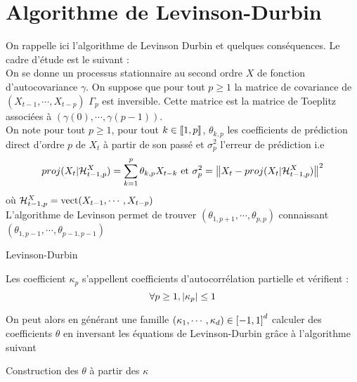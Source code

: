 \documentclass{report}
\begin{document}
\section{Algorithme de Levinson-Durbin}
On rappelle ici l'algorithme de Levinson Durbin et quelques conséquences. Le cadre d'étude est le suivant : \\
On se donne un processus stationnaire au second ordre $X$ de fonction d'autocovariance $\gamma$. On suppose que pour tout $p\geq 1$ la matrice de covariance de $(X_{t-1}, \cdots , X_{t-p})$ $\Gamma_p$ est inversible. Cette matrice est la matrice de Toeplitz associées à $(\gamma(0),\cdots, \gamma(p-1))$.  \\
On note pour tout $p\geq 1$, pour tout $k\in { \left\llbracket 1,p \right\rrbracket}$, $\theta_{k,p}$ les coefficients de prédiction direct d'ordre $p$ de $X_t$ à partir de son passé et $\sigma_p^2$ l'erreur de prédiction i.e 
$$
proj(X_t | \mathcal{H}_{t-1,p}^X)= \sum_{k=1}^p \theta_{k,p} X_{t-k} 
\mbox{ et } 
\sigma_p^2 = { \left\| X_t - proj(X_t | \mathcal{H}_{t-1,p}^X) \right\|}^2
$$
où $\mathcal{H}_{t-1,p}^X = \operatorname{vect}(X_{t-1}, \cdots, X_{t-p})$ \\
L'algorithme de Levinson permet de trouver $(\theta_{1,p+1}, \cdots, \theta_{p,p})$ connaissant $(\theta_{1,p-1}, \cdots, \theta_{p-1,p-1})$\\
\begin{algorithm}[H]
 \caption{Levinson-Durbin}
 \label{algo:levinson}
\end{algorithm}
\begin{Prop}
Les coefficient $\kappa_p$ s'appellent coefficients d'autocorrélation partielle et vérifient :
$$
\forall p\geq 1, { \left| \kappa_p \right|} \leq 1
$$
\end{Prop}
On peut alors en générant une famille $(\kappa_1, \cdots , \kappa_d) \in { \left[ -1,1 \right]}^d$ calculer des coefficients $\theta$ en inversant les équations de Levinson-Durbin grâce à l'algorithme suivant \\
\begin{algorithm}[H]
 \caption{Construction des $\theta$ à partir  des $\kappa$}
 \label{algo:construction}
\end{algorithm}
\end{document}
